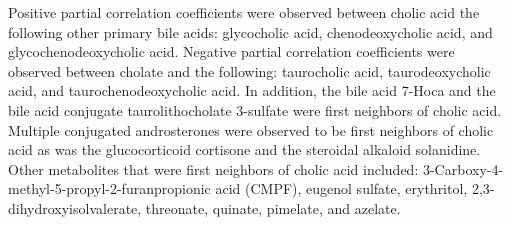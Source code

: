 Positive partial correlation coefficients were observed between cholic acid the following other primary bile acids: glycocholic acid, chenodeoxycholic acid, and glycochenodeoxycholic acid. Negative partial correlation coefficients were observed between cholate and the following: taurocholic acid, taurodeoxycholic acid, and taurochenodeoxycholic acid. In addition, the bile acid 7-Hoca and the bile acid conjugate taurolithocholate 3-sulfate were first neighbors of cholic acid. Multiple conjugated androsterones were observed to be first neighbors of cholic acid as was the glucocorticoid cortisone and the steroidal alkaloid solanidine. Other metabolites that were first neighbors of cholic acid included: 3-Carboxy-4-methyl-5-propyl-2-furanpropionic acid (CMPF), eugenol sulfate, erythritol, 2,3-dihydroxyisolvalerate, threonate, quinate, pimelate, and azelate.
